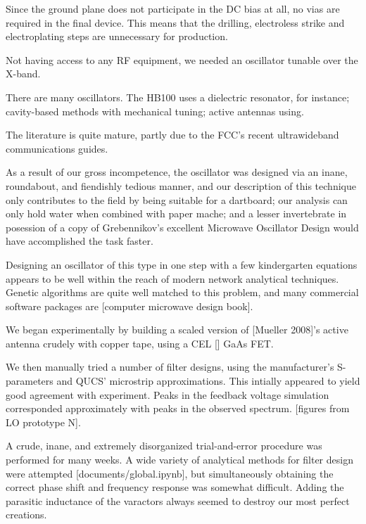 \documentclass[paper.tex]{subfiles}
\begin{document}
Since the ground plane does not participate in the DC bias at all, no vias are required in the final device. This means that the drilling, electroless strike and electroplating steps are unnecessary for production.



Not having access to any RF equipment, we needed an oscillator tunable over the X-band.

There are many oscillators. The HB100 uses a dielectric resonator, for instance; cavity-based methods with mechanical tuning; active antennas using. 


The literature is quite mature, partly due to the FCC's recent ultrawideband communications guides.

As a result of our gross incompetence, the oscillator was designed via an inane, roundabout, and fiendishly tedious manner, and our description of this technique only contributes to the field by being suitable for a dartboard; our analysis can only hold water when combined with paper mache; and a lesser invertebrate in posession of a copy of Grebennikov's excellent Microwave Oscillator Design would have accomplished the task faster.


Designing an oscillator of this type in one step with a few kindergarten equations appears to be well within the reach of modern network analytical techniques. Genetic algorithms are quite well matched to this problem, and many commercial software packages are  [computer microwave design book]. 


We began experimentally by building a scaled version of [Mueller 2008]'s active antenna crudely with copper tape, using a CEL [] GaAs FET.


We then manually tried a number of filter designs, using the manufacturer's S-parameters and QUCS' microstrip approximations. This intially appeared to yield good agreement with experiment. Peaks in the feedback voltage simulation corresponded approximately with peaks in the observed spectrum. [figures from LO prototype N]. 

A crude, inane, and extremely disorganized trial-and-error procedure was performed for many weeks. A wide variety of analytical methods for filter design were attempted [documents/global.ipynb], but simultaneously obtaining the correct phase shift and frequency response was somewhat difficult. Adding the parasitic inductance of the varactors always seemed to destroy our most perfect creations.
\end{document}
